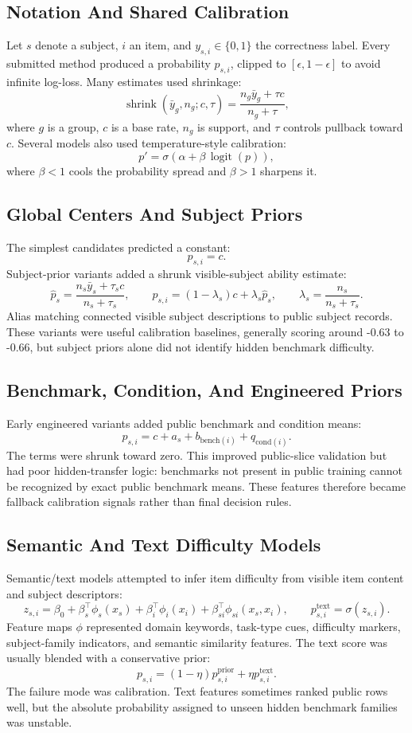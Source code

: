 \documentclass[11pt]{article}
\begin{document}
\subsection{Notation And Shared Calibration}
Let \(s\) denote a subject, \(i\) an item, and \(y_{s,i}\in\{0,1\}\) the correctness label. Every submitted method produced a probability \(p_{s,i}\), clipped to \([\epsilon,1-\epsilon]\) to avoid infinite log-loss. Many estimates used shrinkage:
\[
  \operatorname{shrink}(\bar y_g,n_g;c,\tau)
  =
  \frac{n_g\bar y_g+\tau c}{n_g+\tau},
\]
where \(g\) is a group, \(c\) is a base rate, \(n_g\) is support, and \(\tau\) controls pullback toward \(c\). Several models also used temperature-style calibration:
\[
  p'=\sigma\left(\alpha+\beta\,\operatorname{logit}(p)\right),
\]
where \(\beta<1\) cools the probability spread and \(\beta>1\) sharpens it.

\subsection{Global Centers And Subject Priors}
The simplest candidates predicted a constant:
\[
  p_{s,i}=c.
\]
Subject-prior variants added a shrunk visible-subject ability estimate:
\[
  \hat p_s=\frac{n_s\bar y_s+\tau_s c}{n_s+\tau_s},
  \qquad
  p_{s,i}=(1-\lambda_s)c+\lambda_s\hat p_s,
  \qquad
  \lambda_s=\frac{n_s}{n_s+\tau_s}.
\]
Alias matching connected visible subject descriptions to public subject records. These variants were useful calibration baselines, generally scoring around -0.63 to -0.66, but subject priors alone did not identify hidden benchmark difficulty.

\subsection{Benchmark, Condition, And Engineered Priors}
Early engineered variants added public benchmark and condition means:
\[
  p_{s,i}=c+a_s+b_{\mathrm{bench}(i)}+q_{\mathrm{cond}(i)}.
\]
The terms were shrunk toward zero. This improved public-slice validation but had poor hidden-transfer logic: benchmarks not present in public training cannot be recognized by exact public benchmark means. These features therefore became fallback calibration signals rather than final decision rules.

\subsection{Semantic And Text Difficulty Models}
Semantic/text models attempted to infer item difficulty from visible item content and subject descriptors:
\[
  z_{s,i}
  =
  \beta_0+\beta_s^\top\phi_s(x_s)
  +\beta_i^\top\phi_i(x_i)
  +\beta_{si}^\top\phi_{si}(x_s,x_i),
  \qquad
  p^{\mathrm{text}}_{s,i}=\sigma(z_{s,i}).
\]
Feature maps \(\phi\) represented domain keywords, task-type cues, difficulty markers, subject-family indicators, and semantic similarity features. The text score was usually blended with a conservative prior:
\[
  p_{s,i}=(1-\eta)p^{\mathrm{prior}}_{s,i}+\eta p^{\mathrm{text}}_{s,i}.
\]
The failure mode was calibration. Text features sometimes ranked public rows well, but the absolute probability assigned to unseen hidden benchmark families was unstable.
\end{document}
